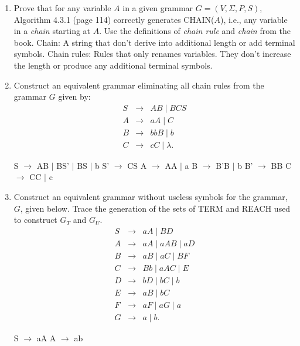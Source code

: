 \documentclass{article}
\begin{document}
\begin{enumerate}
 
\item Prove that for any variable $A$ in a given grammar $G = (V,
  \Sigma, P, S)$, Algorithm 4.3.1 (page 114) correctly generates
  CHAIN($A$), i.e., any variable in a \emph{chain} starting at
  $A$. Use the definitions of \emph{chain rule} and \emph{chain} from
  the book.
  \newline Chain: A string that don't derive into additional length or add terminal symbols. 
  \newline Chain rules: Rules that only renames variables. They don't increase the length or produce any additional terminal symbols.

\item Construct an equivalent grammar eliminating all chain rules from
  the grammar $G$ given by:
     \begin{eqnarray*}
      S &\rightarrow& AB \mid BCS\\
      A &\rightarrow& aA \mid C\\
      B &\rightarrow& bbB \mid b\\
      C &\rightarrow& cC \mid \lambda.
     \end{eqnarray*}
     
\newline S $\rightarrow$ AB $|$ BS' $|$ BS $|$ b
\newline S' $\rightarrow$ CS
\newline A $\rightarrow$ AA $|$ a
\newline B $\rightarrow$ B'B $|$ b
\newline B' $\rightarrow$ BB
\newline C $\rightarrow$ CC $|$ c
  
   \item Construct an equivalent grammar without useless symbols for
     the grammar, $G$, given below. Trace the generation of the sets of
     TERM and REACH used to construct $G_T$ and $G_U$.
     \begin{eqnarray*}
      S &\rightarrow& aA \mid BD\\
      A &\rightarrow& aA \mid aAB \mid aD\\
      B &\rightarrow& aB \mid aC \mid BF\\
      C &\rightarrow& Bb \mid aAC \mid E\\
      D &\rightarrow& bD \mid bC \mid b\\      
      E &\rightarrow& aB \mid bC \\
      F &\rightarrow& aF \mid aG \mid a\\
      G &\rightarrow& a \mid b.
    \end{eqnarray*}
    
\newline S $\rightarrow$ aA
\newline A $\rightarrow$ ab
     
\end{enumerate}  
     
\end{document}

